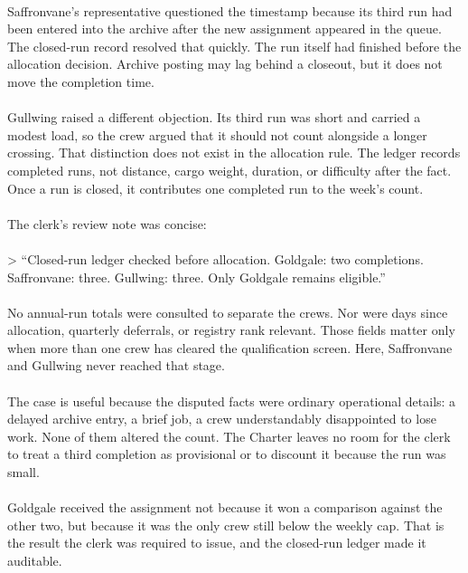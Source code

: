 \documentclass[9pt]{article}
\begin{document}
\begin{minipage}[t]{\textwidth}
\begin{minipage}[t]{0.49\textwidth}
\begin{exbox}
{  \  \\
  Saffronvane's representative questioned the timestamp because its third run had been entered into the archive after the new assignment appeared in the queue. The closed-run record resolved that quickly. The run itself had finished before the allocation decision. Archive posting may lag behind a closeout, but it does not move the completion time. \\
  \  \\
  Gullwing raised a different objection. Its third run was short and carried a modest load, so the crew argued that it should not count alongside a longer crossing. That distinction does not exist in the allocation rule. The ledger records completed runs, not distance, cargo weight, duration, or difficulty after the fact. Once a run is closed, it contributes one completed run to the week's count. \\
  \  \\
  The clerk's review note was concise: \\
  \  \\
  \textgreater{} ``Closed-run ledger checked before allocation. Goldgale: two completions. Saffronvane: three. Gullwing: three. Only Goldgale remains eligible.'' \\
  \  \\
  No annual-run totals were consulted to separate the crews. Nor were days since allocation, quarterly deferrals, or registry rank relevant. Those fields matter only when more than one crew has cleared the qualification screen. Here, Saffronvane and Gullwing never reached that stage. \\
  \  \\
  The case is useful because the disputed facts were ordinary operational details: a delayed archive entry, a brief job, a crew understandably disappointed to lose work. None of them altered the count. The Charter leaves no room for the clerk to treat a third completion as provisional or to discount it because the run was small. \\
  \  \\
  Goldgale received the assignment not because it won a comparison against the other two, but because it was the only crew still below the weekly cap. That is the result the clerk was required to issue, and the closed-run ledger made it auditable.}
\end{exbox}
\end{minipage}
\end{minipage}
\clearpage
\end{document}
